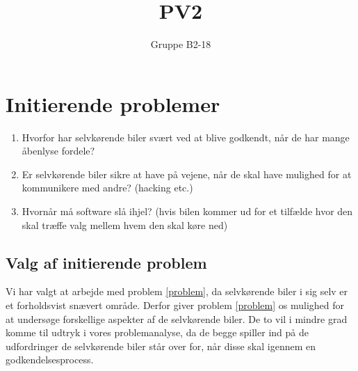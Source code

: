 \documentclass{article}
\begin{document}
	\title{PV2}
	\author{Gruppe B2-18}
	\maketitle
	\section*{Initierende problemer}
	\begin{enumerate}
		\item Hvorfor har selvkørende biler svært ved at blive godkendt, når de har mange åbenlyse fordele? \label{problem}
		\item Er selvkørende biler sikre at have på vejene, når de skal have mulighed for at kommunikere med andre? (hacking etc.)
		\item Hvornår må software slå ihjel? (hvis bilen kommer ud for et tilfælde hvor den skal træffe valg mellem hvem den skal køre ned)
	\end{enumerate}

	\subsection*{Valg af initierende problem}
	Vi har valgt at arbejde med problem \ref{problem}, da selvkørende biler i sig selv er et forholdsvist snævert område. Derfor giver problem \ref{problem} os mulighed for at undersøge forskellige aspekter af de selvkørende biler. De to vil i mindre grad komme til udtryk i vores problemanalyse, da de begge spiller ind på de udfordringer de selvkørende biler står over for, når disse skal igennem en godkendelsesprocess.
\end{document}
